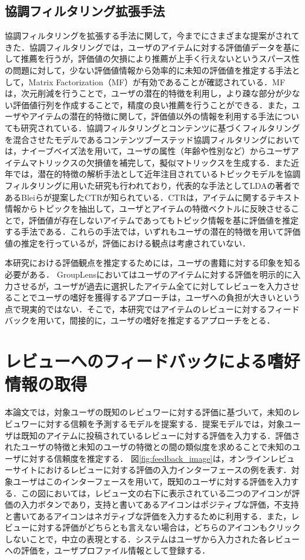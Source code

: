 \documentclass[a4paper,11pt,oneside,openany]{jsbook}
\begin{document}
	\section{協調フィルタリング拡張手法}
協調フィルタリングを拡張する手法に関して，今までにさまざまな提案がされてきた．協調フィルタリングでは，ユーザのアイテムに対する評価値データを基にして推薦を行うが，評価値の欠損により推薦が上手く行えないというスパース性の問題に対して，少ない評価値情報から効率的に未知の評価値を推定する手法として，Matrix Factorization（MF）\cite{MF}が有効であることが確認されている．MFは，次元削減を行うことで，ユーザの潜在的特徴を利用し，より疎な部分が少ない評価値行列を作成することで，精度の良い推薦を行うことができる．また，ユーザやアイテムの潜在的特徴に関して，評価値以外の情報を利用する手法についても研究されている．協調フィルタリングとコンテンツに基づくフィルタリングを混合させたモデルであるコンテンツブーステッド協調フィルタリング\cite{Melville}においては，ナイーブベイズ法を用いて，ユーザの属性（年齢や性別など）からユーザアイテムマトリックスの欠損値を補完して，擬似マトリックスを生成する．また近年では，潜在的特徴の解析手法として近年注目されているトピックモデルを協調フィルタリングに用いた研究も行われており，代表的な手法としてLDAの著者であるBleiらが提案したCTRが知られている\cite{CTR}．CTRは，アイテムに関するテキスト情報からトピックを抽出して，ユーザとアイテムの特徴ベクトルに反映させることで，評価値が存在しないアイテムであってもトピック情報を基に評価値を推定する手法である．これらの手法では，いずれもユーザの潜在的特徴を用いて評価値の推定を行っているが，評価における観点は考慮されていない．
\par
本研究における評価観点を推定するためには，ユーザの書籍に対する印象を知る必要がある．
GroupLens\cite{grouplens}においてはユーザのアイテムに対する評価を明示的に入力させるが，ユーザが過去に選択したアイテム全てに対してレビューを入力させることでユーザの嗜好を獲得するアプローチは，ユーザへの負担が大きいという点で現実的ではない．そこで，本研究ではアイテムのレビューに対するフィードバックを用いて，間接的に，ユーザの嗜好を推定するアプローチをとる．


\chapter{レビューへのフィードバックによる嗜好情報の取得}
\label{sec:feedback}
本論文では，対象ユーザの既知のレビュワーに対する評価に基づいて，未知のレビュワーに対する信頼を予測するモデルを提案する．提案モデルでは，対象ユーザは既知のアイテムに投稿されているレビューに対する評価を入力する．評価されたユーザの特徴と未知のユーザの特徴との間の類似度を求めることで未知のユーザに対する信頼度を推定する．
図\ref{fig:feedback_image}は，オンラインレビューサイトにおけるレビューに対する評価の入力インターフェースの例を表す．対象ユーザはこのインターフェースを用いて，既知のユーザに対する評価を入力する．この図においては，レビュー文の右下に表示されている二つのアイコンが評価の入力ボタンであり，支持と書いてあるアイコンはポジティブな評価，不支持と書いてあるアイコンはネガティブな評価を入力するために利用する．また，レビューに対する評価がどちらとも言えない場合は，どちらのアイコンもクリックしないことで，中立の表現とする．システムはユーザから入力された各レビューへの評価を，ユーザプロファイル情報として登録する．
\end{document}
